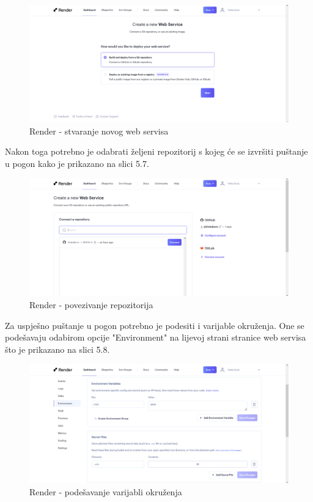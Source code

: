 			\begin{figure}[H]
				\includegraphics[width=\textwidth]{slike/deploy10.PNG}
				\caption{Render - stvaranje novog web servisa}
				\label{fig:deployment10}
			\end{figure}
			
			Nakon toga potrebno je odabrati željeni repozitorij s kojeg će se izvršiti puštanje u pogon kako je prikazano na slici 5.7.
			
			\begin{figure}[H]
				\includegraphics[width=\textwidth]{slike/deploy11.PNG}
				\caption{Render - povezivanje repozitorija}
				\label{fig:deployment11}
			\end{figure}
			
			Za uspješno puštanje u pogon potrebno je podesiti i varijable okruženja. One se podešavaju odabirom opcije "Environment" na lijevoj strani stranice web servisa što je prikazano na slici 5.8.
			
			\begin{figure}[H]
				\includegraphics[width=\textwidth]{slike/deploy5.PNG}
				\caption{Render - podešavanje varijabli okruženja}
				\label{fig:deployment5}
			\end{figure}
			

